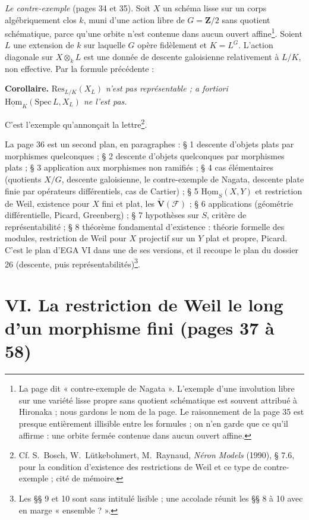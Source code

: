 \documentclass[11pt,a4paper]{article}
\begin{document}
\emph{Le contre-exemple} (pages 34 et 35). Soit $X$ un schéma lisse sur un corps
algébriquement clos $k$, muni d'une action libre de $G = \mathbf{Z}/2$ sans
quotient schématique, parce qu'une orbite n'est contenue dans aucun ouvert
affine\footnote{La page dit « contre-exemple de Nagata ». L'exemple d'une
involution libre sur une variété lisse propre sans quotient schématique est
souvent attribué à Hironaka ; nous gardons le nom de la page. Le raisonnement
de la page 35 est presque entièrement illisible entre les formules ; on n'en
garde que ce qu'il affirme : une orbite fermée contenue dans aucun ouvert
affine.}. Soient $L$ une extension de $k$ sur laquelle $G$ opère fidèlement et
$K = L^{G}$. L'action diagonale sur $X \otimes_k L$ est une donnée de descente
galoisienne relativement à $L/K$, non effective. Par la formule précédente :

\textbf{Corollaire.} \emph{$\mathrm{Res}_{L/K}(X_L)$ n'est pas représentable ; a
fortiori $\underline{\mathrm{Hom}}_K(\mathrm{Spec}\,L, X_L)$ ne l'est pas.}

C'est l'exemple qu'annonçait la lettre\footnote{Cf. S.~Bosch, W.~Lütkebohmert,
M.~Raynaud, \emph{Néron Models} (1990), § 7.6, pour la condition d'existence
des restrictions de Weil et ce type de contre-exemple ; cité de mémoire.}.

La page 36 est un second plan, en paragraphes : § 1 descente d'objets plats
par morphismes quelconques ; § 2 descente d'objets quelconques par morphismes
plats ; § 3 application aux morphismes non ramifiés ; § 4 cas élémentaires
(quotients $X/G$, descente galoisienne, le contre-exemple de Nagata,
descente plate finie par opérateurs différentiels, cas de Cartier) ; § 5
$\underline{\mathrm{Hom}}_S(X,Y)$ et restriction de Weil, existence pour $X$ fini et
plat, les $\check{\mathbf{V}}(\mathcal{F})$ ; § 6 applications (géométrie
différentielle, Picard, Greenberg) ; § 7 hypothèses sur $S$, critère de
représentabilité ; § 8 théorème fondamental d'existence : théorie formelle des
modules, restriction de Weil pour $X$ projectif sur un $Y$ plat et propre,
Picard. C'est le plan d'EGA VI dans une de ses versions, et il recoupe le plan
du dossier 26 (descente, puis représentabilités)\footnote{Les §§ 9 et 10 sont
sans intitulé lisible ; une accolade réunit les §§ 8 à 10 avec en marge
« ensemble ? ».}.

\section*{VI. La restriction de Weil le long d'un morphisme fini (pages 37 à 58)}
\end{document}
